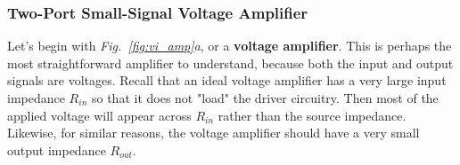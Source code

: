 \subsubsection{Two-Port Small-Signal Voltage Amplifier}
Let's begin with \emph{Fig.~\ref{fig:vi_amp}a}, or a \textbf{voltage amplifier}.  This is perhaps the most straightforward amplifier to understand, because both the input and output signals are voltages.  Recall that an ideal voltage amplifier has a very large input impedance $R_{in}$ so that it does not "load" the driver circuitry. Then most of the applied voltage will appear across $R_{in}$ rather than the source impedance.  Likewise, for similar reasons, the voltage amplifier should have a very small output impedance $R_{out}$.

